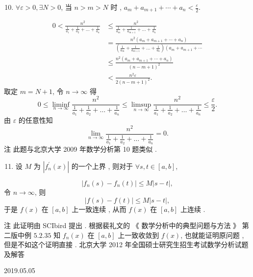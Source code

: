 \documentclass[10pt]{article}
\begin{document}
\begin{enumerate}
  \setcounter{enumi}{9}
  \item $\forall \varepsilon>0, \exists N>0$,  当  $n>m>N$  时 , $a_{m}+a_{m+1}+\cdots+a_{n}<\frac{\varepsilon}{2}$.
\end{enumerate}
$$
\begin{aligned}
0<\frac{n^{2}}{\frac{1}{a_{1}}+\frac{1}{a_{2}}+\ldots+\frac{1}{a_{n}}} & \leqslant \frac{n^{2}}{\frac{1}{a_{m}}+\frac{1}{a_{m+1}}+\ldots+\frac{1}{a_{n}}} \\
&=\frac{n^{2}\left(a_{m}+a_{m+1}+\cdots+a_{n}\right)}{\left(\frac{1}{a_{m}}+\frac{1}{a_{m+1}}+\ldots+\frac{1}{a_{n}}\right)\left(a_{m}+a_{m+1}+\cdots\right.} \\
& \leqslant \frac{n^{2}\left(a_{m}+a_{m+1}+\cdots+a_{n}\right)}{(n-m+1)^{2}} \\
&<\frac{n^{2} \varepsilon}{2(n-m+1)^{2}} .
\end{aligned}
$$
 取定  $m=N+1$,  令  $n \rightarrow \infty$  得 
$$
0 \leqslant \liminf _{n \rightarrow \infty} \frac{n^{2}}{\frac{1}{a_{1}}+\frac{1}{a_{2}}+\ldots+\frac{1}{a_{n}}} \leqslant \limsup _{n \rightarrow \infty} \frac{n^{2}}{\frac{1}{a_{1}}+\frac{1}{a_{2}}+\ldots+\frac{1}{a_{n}}} \leqslant \frac{\varepsilon}{2} .
$$
 由  $\varepsilon$  的任意性知 
$$
\lim _{n \rightarrow \infty} \frac{n^{2}}{\frac{1}{a_{1}}+\frac{1}{a_{2}}+\ldots+\frac{1}{a_{n}}}=0 .
$$
 注   此题与北京大学  2009  年数学分析第  10  题类似 .

\begin{enumerate}
  \setcounter{enumi}{10}
  \item  设  $M$  为  $\left|f_{n}^{\prime}(x)\right|$  的一个上界 ,  则对于  $\forall s, t \in[a, b]$,
\end{enumerate}
$$
\left|f_{n}(s)-f_{n}(t)\right| \leqslant M|s-t|,
$$
 令  $n \rightarrow \infty$,  则 
$$
|f(s)-f(t)| \leqslant M|s-t|,
$$
 于是  $f(x)$  在  $[a, b]$  上一致连续 ,  从而  $f(x)$  在  $[a, b]$  上连续 .

 注   此证明由  SCIbird  提出 .  根据裴礼文的 《 数学分析中的典型问题与方法 》 第二版中例  $5.2 .35$  知  $f_{n}(x)$  在  $[a, b]$  上一致收敛到  $f(x)$,  也就能证明原问题 ,  但是不如这个证明直接 .  北京大学  2012  年全国硕士研究生招生考试数学分析试题及解答 

   

2019.05.05
\end{document}
